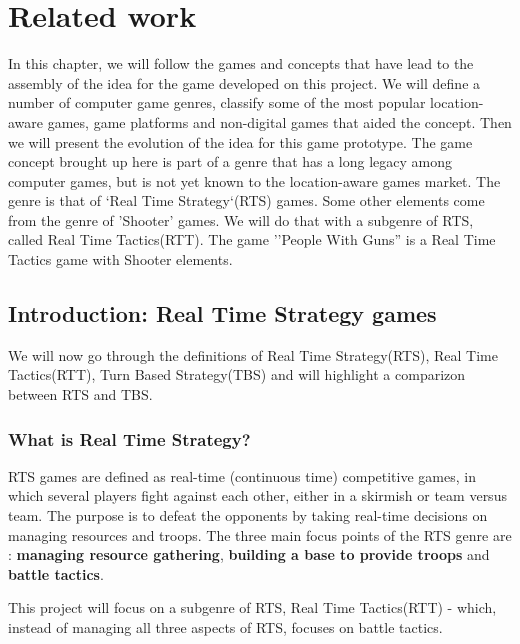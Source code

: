 
\section{Related work}

In this chapter, we will follow the games and concepts that have lead to the
assembly of the idea for the game developed on this project. We will define a
number of computer game genres, classify some of the most popular location-aware
games, game platforms and non-digital games that aided the concept. Then we will
present the evolution of the idea for this game prototype. The game concept
brought up here is part of a genre that has a long legacy among computer games,
but is not yet known to the location-aware games market. The genre is that of
`Real Time Strategy`(RTS)\cite{rts} games. Some other elements come from the
genre of 'Shooter' games\cite{shooter}. We will do that with a subgenre of RTS,
called Real Time Tactics(RTT)\cite{rttvsrts}. The game ''People With Guns'' is a
Real Time Tactics game with Shooter elements.\newline


\subsection{Introduction: Real Time Strategy games}

We will now go through the definitions of Real Time Strategy(RTS), Real Time
Tactics(RTT), Turn Based Strategy(TBS) and will highlight a comparizon between
RTS and TBS.

\subsubsection{What is Real Time Strategy?}

RTS games are defined as real-time (continuous time) competitive games, in which
several players fight against each other, either in a skirmish or team versus
team. The purpose is to defeat the opponents by taking real-time decisions on
managing resources and troops. The three main focus points of the RTS genre
are : \textbf{managing resource gathering}, \textbf{building a base to provide
troops} and \textbf{battle tactics}.\cite{rts}\newline

This project will focus on a subgenre of RTS, Real Time Tactics(RTT) - which,
instead of managing all three aspects of RTS, focuses on battle tactics.\newline

